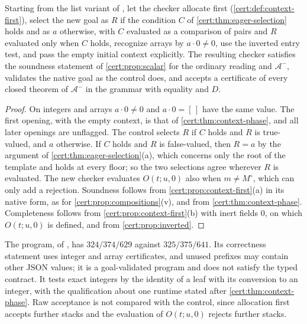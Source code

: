 \begin{proposition}\label{cert:prop:native-composition}
Starting from the list variant of , let the checker
allocate first (\cref{cert:def:context-first}), select the new goal as $R$ if
the condition $C$ of \cref{cert:thm:eager-selection} holds and as $a$
otherwise, with $C$ evaluated as a comparison of pairs and $R$ evaluated only
when $C$ holds, recognize arrays by $a\cdot 0\neq 0$, use the inverted entry
test, and pass the empty initial context explicitly. The resulting checker
satisfies the soundness statement of \cref{cert:prop:scalar} for the ordinary
reading and $\mathcal A^{-}$, validates the native goal as the control does,
and accepts a certificate of every closed theorem of $\mathcal A^{-}$ in the
grammar with equality and $D$.
\end{proposition}
\begin{proof}
On integers and arrays $a\cdot 0\neq0$ and $a\cdot0=[\,]$ have the same
value. The first opening, with the empty context, is that of
\cref{cert:thm:context-phase}, and all later openings are unflagged. The
control selects $R$ if $C$ holds and $R$ is true-valued, and $a$ otherwise.
If $C$ holds and $R$ is false-valued, then $R=a$ by the argument of
\cref{cert:thm:eager-selection}(a), which concerns only the root of the
template and holds at every floor; so the two selections agree wherever $R$
is evaluated. The new checker evaluates $O(t;u,0)$ also when $m\neq M^{\circ}$,
which can only add a rejection. Soundness follows from
\cref{cert:prop:context-first}(a) in its native form, as for
\cref{cert:prop:compositions}(v), and from \cref{cert:thm:context-phase}.
Completeness follows from \cref{cert:prop:context-first}(b) with inert fields
$0$, on which $O(t;u,0)$ is defined, and from \cref{cert:prop:inverted}.
\end{proof}

The program, of , has $324/374/629$ against
$325/375/641$. Its correctness statement uses integer and array certificates,
and unused prefixes may contain other JSON values; it is a goal-validated
program and does not satisfy the typed contract. It tests exact integers by
the identity of a leaf with its conversion to an integer, with the
qualification about one runtime stated after \cref{cert:thm:context-phase}.
Raw acceptance is not compared with the control, since allocation first
accepts further stacks and the evaluation of $O(t;u,0)$ rejects further
stacks.

